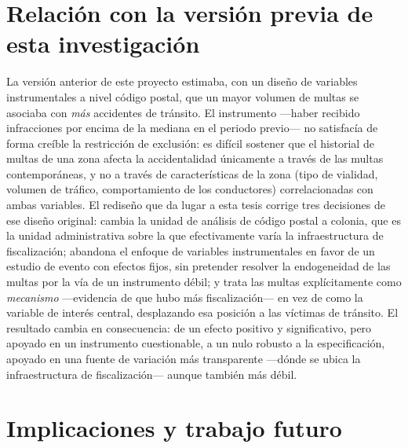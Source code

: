 \section{Relación con la versión previa de esta investigación}

La versión anterior de este proyecto estimaba, con un diseño de variables
instrumentales a nivel código postal, que un mayor volumen de multas se
asociaba con \emph{más} accidentes de tránsito. El instrumento —haber
recibido infracciones por encima de la mediana en el periodo previo— no
satisfacía de forma creíble la restricción de exclusión: es difícil sostener
que el historial de multas de una zona afecta la accidentalidad únicamente a
través de las multas contemporáneas, y no a través de características de la
zona (tipo de vialidad, volumen de tráfico, comportamiento de los
conductores) correlacionadas con ambas variables. El rediseño que da lugar a
esta tesis corrige tres decisiones de ese diseño original: cambia la unidad de
análisis de código postal a colonia, que es la unidad administrativa sobre la
que efectivamente varía la infraestructura de fiscalización; abandona el
enfoque de variables instrumentales en favor de un estudio de evento con
efectos fijos, sin pretender resolver la endogeneidad de las multas por la vía
de un instrumento débil; y trata las multas explícitamente como
\emph{mecanismo} —evidencia de que hubo más fiscalización— en vez de como la
variable de interés central, desplazando esa posición a las víctimas de
tránsito. El resultado cambia en consecuencia: de un efecto positivo y
significativo, pero apoyado en un instrumento cuestionable, a un nulo robusto
a la especificación, apoyado en una fuente de variación más transparente
—dónde se ubica la infraestructura de fiscalización— aunque también más
débil.

\section{Implicaciones y trabajo futuro}

